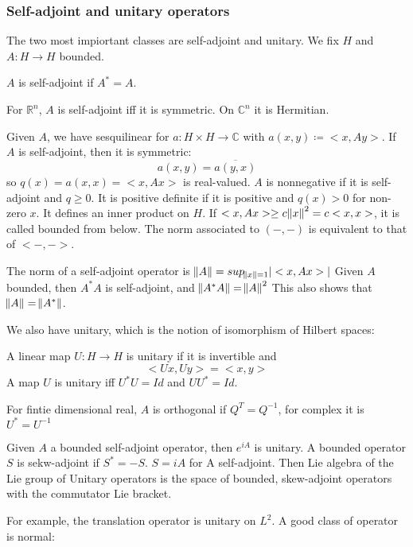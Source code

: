 \documentclass[main.tex]{subfiles}
\begin{document}
\subsubsection{Self-adjoint and unitary operators}
The two most impiortant classes are self-adjoint and unitary. We fix $H$ and $A: H \rightarrow H$ bounded.

\begin{definition}
$A$ is self-adjoint if $A^* = A$.
\end{definition}

\begin{example}
For $\mathbb{R}^n$, $A$ is self-adjoint iff it is symmetric. On $\mathbb{C}^n$ it is Hermitian.
\end{example}

Given $A$, we have sesquilinear for $a: H \times H \rightarrow \mathbb{C}$ with $a(x,y) \coloneq <x, Ay>$. If $A$ is self-adjoint, then it is symmetric:
$$
a(x,y) = \overline{a(y,x)}
$$
so $q(x) = a(x,x) = <x, Ax>$ is real-valued. $A$ is nonnegative if it is self-adjoint and $q \geq 0$. It is positive definite if it is positive and $q(x) > 0$ for non-zero $x$. It defines an inner product on $H$. If $<x, Ax> \geq c \norm{x}^2 = c <x,x>$, it is called bounded from below. The norm associated to $(-,-)$ is equivalent to that of $<-,->$.

The norm of a self-adjoint operator is $\norm{A} = sup_{\norm{x} = 1}|<x, Ax>|$
Given $A$ bounded, then $A^* A$ is self-adjoint, and $\norm{A^* A} = \norm{A}^2$
This also shows that $\norm{A} = \norm{A^*}$.

We also have unitary, which is the notion of isomorphism of Hilbert spaces:

\begin{definition}
A linear map $U: H \rightarrow H$ is unitary if it is invertible and 
$$
<Ux, Uy> = <x,y>
$$
A map $U$ is unitary iff $U^*U = Id$ and $U U^* = Id$.
\end{definition}
For fintie dimensional real, $A$ is orthogonal if $Q^T = Q^{-1}$, for complex it is $U^* = U^{-1}$

Given $A$ a bounded self-adjoint operator, then $e^{iA}$ is unitary. A bounded operator $S$ is sekw-adjoint if $S^* = -S$. $S = iA$ for A self-adjoint. Then Lie algebra of the Lie group of Unitary operators is the space of bounded, skew-adjoint operators with the commutator Lie bracket. 

For example, the translation operator is unitary on $L^2$. A good class of operator is normal:
\end{document}
